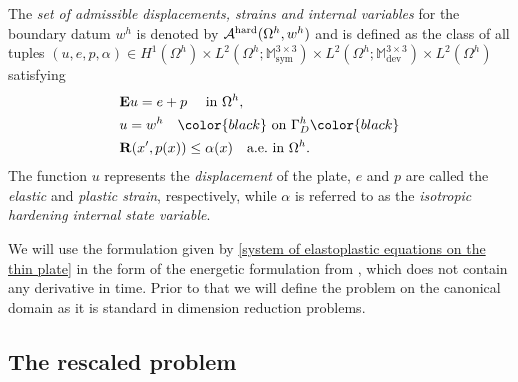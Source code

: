 \documentclass[reqno,10pt]{amsart}
\numberwithin{equation}{section}
\theoremstyle{remark}
\newcommand{\RED}{\color{black}}
\newcommand{\BLACK}{\color{black}}
\newcommand{\PINK}{\color{black}}
\newcommand{\calA}{\mathcal{A}}
\newcommand{\M}{\mathbb{M}}
\DeclareMathOperator{\dev}{dev}
\DeclareMathOperator{\sym}{sym}
\newcommand{\Dir}{D}
\newcommand{\E}{{\bf E}}
\newcommand{\disspot}{\mathbf{R}}
\begin{document}
The {\em set of admissible displacements, strains and internal variables} for the boundary datum $w^h$ is denoted by 
$\calA^{\rm hard}(\Omega^h, w^h)$ and is defined as the class of all tuples 
$(u, e, p, \alpha) \in H^1(\Omega^h) \times L^2(\Omega^h;\M^{3 \times 3}_{\sym}) \times L^2(\Omega^h;\M^{3 \times 3}_{\dev}) \times L^2(\Omega^h)$ satisfying
\begin{eqnarray*}
	& {\E}u = e + p \quad \text{ in } \Omega^h,
	\\& u = w^h \quad {\PINK\text{ on } \Gamma_\Dir^h\BLACK}
	\\& \disspot(x', p(x)) \leq \alpha(x) \quad \text{a.e.} \text{ in } \Omega^h.
\end{eqnarray*}
The function $u$ represents the {\em displacement} of the plate, $e$ and $p$ are called the {\em elastic} and {\em plastic strain}, respectively, while $\alpha$ is referred to as the \emph{isotropic hardening internal state variable}.

We will use the formulation given by \eqref{system of elastoplastic equations on the thin plate} in the form of the energetic formulation from \cite{Mielke.Roubicek.2015}, which {\RED does not\BLACK} contain any derivative in time.
Prior to that we will define the problem on the canonical domain as it is standard in dimension reduction problems.

\subsection{The rescaled problem} \label{section rescaled} 
\end{document}

